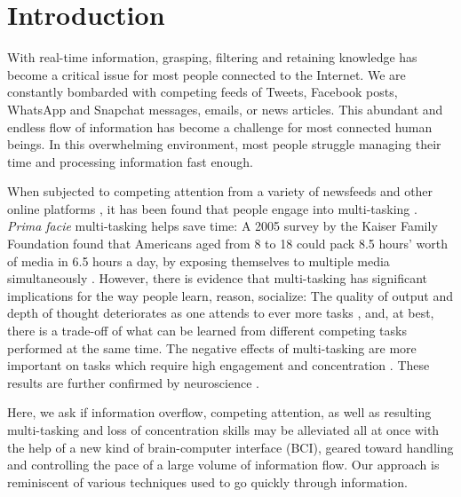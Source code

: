 \section{Introduction}
\label{intro}
With real-time information, grasping, filtering and retaining knowledge has become a critical issue for most people connected to the Internet. We are constantly bombarded with competing feeds of Tweets, Facebook posts, WhatsApp and Snapchat messages, emails, or news articles. This abundant and endless flow of information has become a challenge for most connected human beings. In this overwhelming environment, most people struggle managing their time \cite{maillart2011} and processing information fast enough. 

When subjected to competing attention \cite{hansen2001competing} from a variety of newsfeeds and other online platforms \cite{foehr2006media,harris2016}, it has been found that people engage into multi-tasking \cite{wallis2006multitasking}. {\it Prima facie} multi-tasking helps save time: A 2005 survey by the Kaiser Family Foundation found that Americans aged from 8 to 18 could pack 8.5 hours' worth of media in 6.5 hours a day, by exposing themselves to multiple media simultaneously \cite{roberts2005generation}. However, there is evidence that multi-tasking has significant implications for the way people learn, reason, socialize: The quality of output and depth of thought deteriorates as one attends to ever more tasks \cite{hembrooke2003laptop}, and, at best, there is a trade-off of what can be learned from different competing tasks performed at the same time. The negative effects of multi-tasking are more important on tasks which require high engagement and concentration \cite{wallis2006multitasking}. These results are further confirmed by neuroscience \cite{burgess2000strategy}.

Here, we ask if information overflow, competing attention, as well as resulting multi-tasking and loss of concentration skills may be alleviated all at once with the help of a new kind of brain-computer interface (BCI), geared toward handling and controlling the pace of a large volume of information flow. Our approach is reminiscent of various techniques used to go quickly through information.

